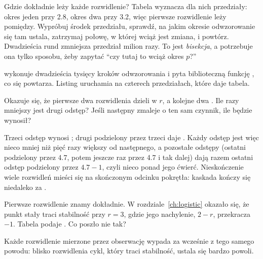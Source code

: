 \noindent
Gdzie dokładnie leży każde rozwidlenie? Tabela wyznacza dla nich
przedziały: okres jeden przy \num{2.8}, okres dwa przy \num{3.2}, więc
pierwsze rozwidlenie leży pomiędzy. Wypróbuj środek przedziału, sprawdź, na
jakim okresie odwzorowanie się tam ustala, zatrzymaj połowę, w której wciąż
jest zmiana, i powtórz. Dwadzieścia rund zmniejsza przedział milion razy. To
jest \emph{bisekcja}, a potrzebuje ona tylko sposobu, żeby zapytać
\enquote{czy tutaj to wciąż okres $p$?}


\noindent
{} wykonuje dwadzieścia tysięcy kroków odwzorowania i
pyta biblioteczną funkcję , co się powtarza. Listing uruchamia
 na czterech przedziałach, które daje tabela.

\begin{think}
Okazuje się, że pierwsze dwa rozwidlenia dzieli  w $r$, a
kolejne dwa . Ile razy mniejszy jest drugi odstęp? Jeśli
następny zmaleje o ten sam czynnik, ile będzie wynosił?
\end{think}


\noindent
Trzeci odstęp wynosi ; drugi podzielony przez trzeci
daje . Każdy odstęp jest więc nieco mniej niż pięć razy
większy od następnego, a pozostałe odstępy (ostatni podzielony przez
\num{4.7}, potem jeszcze raz przez \num{4.7} i tak dalej) dają razem
ostatni odstęp podzielony przez $\num{4.7} - 1$, czyli nieco ponad jego
ćwierć. Nieskończenie wiele rozwidleń mieści się na skończonym odcinku
pokrętła: kaskada kończy się niedaleko za .

\begin{think}
Pierwsze rozwidlenie znamy dokładnie. W rozdziale~\ref{ch:logistic} okazało
się, że punkt stały traci stabilność przy $r = 3$, gdzie jego nachylenie,
$2 - r$, przekracza $-1$. Tabela podaje . Co poszło nie
tak?
\end{think}
Każde rozwidlenie mierzone przez obserwację wypada za wcześnie z tego
samego powodu: blisko rozwidlenia cykl, który traci stabilność, ustala się
bardzo powoli.

